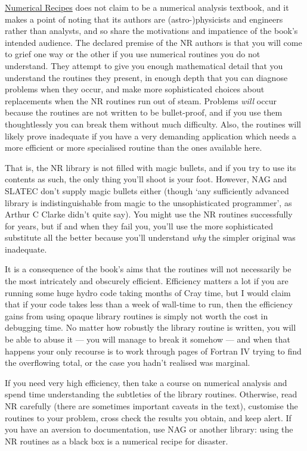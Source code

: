 \documentclass[11pt,oneside,chapters]{starlink}
\begin{document}
\href{http://www.nr.com}{Numerical Recipes}
\citep{nr} does not claim to
be a numerical analysis textbook, and it makes a point of
noting that its authors are (astro-)physicists and
engineers rather than analysts, and so share the
motivations and impatience of the book's intended
audience.  The declared premise of the NR authors is that
you will come to grief one way or the other if you use
numerical routines you do not understand.  They attempt to
give you enough mathematical detail that you understand
the routines they present, in enough depth that you can
diagnose problems when they occur, and make more
sophisticated choices about replacements when the NR
routines run out of steam.  Problems \emph{will} occur
because the routines are not written to be bullet-proof,
and if you use them thoughtlessly you can break them
without much difficulty.  Also, the routines will likely
prove inadequate if you have a very demanding application
which needs a more efficient or more specialised routine
than the ones available here.

That is, the NR library is not filled with magic bullets,
and if you try to use its contents as such, the only thing
you'll shoot is your foot.  However, NAG and SLATEC don't
supply magic bullets either (though `any sufficiently
advanced library is indistinguishable from magic to the
unsophisticated programmer', as Arthur C Clarke didn't
quite say).  You might use the NR routines successfully
for years, but if and when they fail you, you'll use the
more sophisticated substitute all the better because
you'll understand \emph{why} the simpler original was
inadequate.

It is a consequence of the book's aims that the routines
will not necessarily be the most intricately and obscurely
efficient.  Efficiency matters a lot if you are running
some huge hydro code taking months of Cray time, but I
would claim that if your code takes less than a week of
wall-time to run, then the efficiency gains from using
opaque library routines is simply not worth the cost in
debugging time.  No matter how robustly the library
routine is written, you will be able to abuse it --- you
will manage to break it somehow --- and when that happens
your only recourse is to work through pages of Fortran IV
trying to find the overflowing total, or the case you
hadn't realised was marginal.

If you need very high efficiency, then take a course on
numerical analysis and spend time understanding the
subtleties of the library routines.  Otherwise, read NR
carefully (there are sometimes important caveats in the
text), customise the routines to your problem, cross check
the results you obtain, and keep alert.  If you have an
aversion to documentation, use NAG or another library:
using the NR routines as a black box is a numerical recipe
for disaster.
\end{document}
